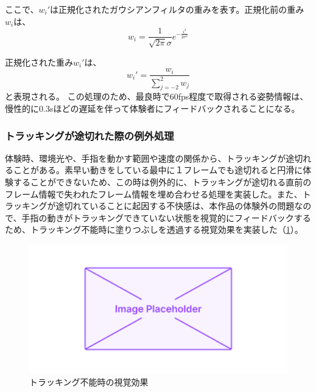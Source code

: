 ここで、\(w_i'\)は正規化されたガウシアンフィルタの重みを表す。正規化前の重み\(w_i\)は、
\begin{equation}
  w_i = \frac{1}{\sqrt{2\pi}\sigma} e^{-\frac{i^2}{2\sigma^2}}
  \end{equation}

正規化された重み\(w_i'\)は、
  \begin{equation}
  w_i' = \frac{w_i}{\sum_{j=-2}^{2} w_j}
  \end{equation}
と表現される。
この処理のため、最良時で60fps程度で取得される姿勢情報は、慢性的に0.3sほどの遅延を伴って体験者にフィードバックされることになる。

\subsubsection*{トラッキングが途切れた際の例外処理}
体験時、環境光や、手指を動かす範囲や速度の関係から、トラッキングが途切れることがある。素早い動きをしている最中に１フレームでも途切れると円滑に体験することができないため、この時は例外的に、トラッキングが途切れる直前のフレーム情報で失われたフレーム情報を埋め合わせる処理を実装した。また、トラッキングが途切れていることに起因する不快感は、本作品の体験外の問題なので、手指の動きがトラッキングできていない状態を視覚的にフィードバックするため、トラッキング不能時に塗りつぶしを透過する視覚効果を実装した（\ref{fig:opacity}）。

\begin{figure}[H]
  \centering
  \includegraphics[width=15cm]{img/placeholder.png}
  \caption{トラッキング不能時の視覚効果}
  \label{fig:opacity}
\end{figure}